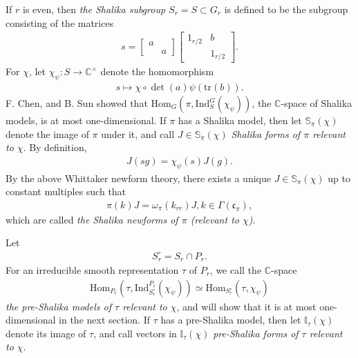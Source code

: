 \documentclass[11pt]{amsart}
\newcommand\w{\omega}
\newcommand\cf{{\mathfrak{c}}}
\newcommand\C{{\mathbb{C}}}%
\newcommand\Sb{{\mathbb{S}}}
\newcommand\Ib{{\mathbb{I}}}
\newcommand\1{\mathbf{1}}
\newcommand\tr{\mathrm{tr}}
\newcommand\In{{\mathrm{Ind}}}%
\newcommand\Hom{{\mathrm{Hom}}}%
\newcommand\tm{\times}
\numberwithin{equation}{section}
\begin{document}
If $r$ is even, then {\it the Shalika subgroup $S_r =S \subset G_r$} is defined to be the subgroup consisting of the matrices 
\begin{align*}
s = \begin{bmatrix}
a &  \\
&a
\end{bmatrix}
\begin{bmatrix}
1_{r/2}& b \\
& 1_{r/2}
\end{bmatrix}.
\end{align*} 
For $\chi$, let $\chi_\psi: S \to \C^\tm$ denote the homomorphism  
\begin{align}
s \longmapsto \chi \circ \det(a) \psi(\tr(b)). \label{def:chipsi}
\end{align} 
F. Chen, and B. Sun \cite{C-S} showed that $\Hom_{G}(\pi, \In_S^G(\chi_\psi))$, the $\C$-space of Shalika models, is at most one-dimensional.
If $\pi$ has a Shalika model, then let $\Sb_\pi(\chi)$ denote the image of $\pi$ under it, and call $J \in \Sb_\pi(\chi)$ {\it Shalika forms of $\pi$ relevant to $\chi$}.
By definition, 
\begin{align}
J(s g) = \chi_\psi(s) J(g). \label{eq:propSh}
\end{align} 
By the above Whittaker newform theory, there exists a unique $J \in \Sb_\pi(\chi)$ up to constant multiples such that 
\begin{align*}
\pi(k) J = \w_\pi(k_{rr})J, k \in \Gamma(\cf_\pi),
\end{align*} 
which are called {\it the Shalika newforms of $\pi$ (relevant to $\chi$)}.

Let
\begin{align*}
S_{r}^\circ = S_{r} \cap P_{r}.
\end{align*} 
For an irreducible smooth representation $\tau$ of $P_r$, we call the $\C$-space 
\begin{align*}
\Hom_{P_r}(\tau, \In_{S_r^\circ}^{P_r}(\chi_\psi)) \simeq \Hom_{S_r^\circ}(\tau, \chi_\psi)
\end{align*} 
{\it the pre-Shalika models of $\tau$ relevant to $\chi$}, and will show that it is at most one-dimensional in the next section.
If $\tau$ has a pre-Shalika model, then let $\Ib_\tau(\chi)$ denote its image of $\tau$, and call vectors in $\Ib_\tau(\chi)$ {\it pre-Shalika forms of $\tau$ relevant to $\chi$}.
\end{document}
